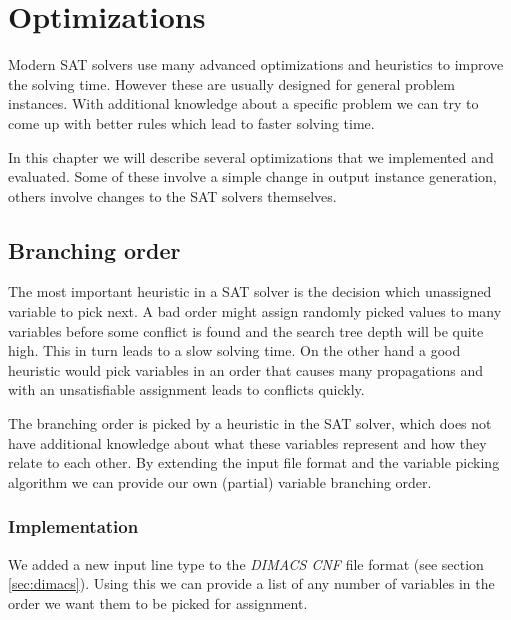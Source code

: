 \section{Optimizations}

Modern SAT solvers use many advanced optimizations and heuristics to improve the solving time.
However these are usually designed for general problem instances.
With additional knowledge about a specific problem we can try to come up with better rules which lead to faster solving time.

In this chapter we will describe several optimizations that we implemented and evaluated.
Some of these involve a simple change in output instance generation, others involve changes to the SAT solvers themselves.


\subsection{Branching order}
\label{sec:branching-order}

The most important heuristic in a SAT solver is the decision which unassigned variable to pick next.
A bad order might assign randomly picked values to many variables before some conflict is found and the search tree depth will be quite high.
This in turn leads to a slow solving time.
On the other hand a good heuristic would pick variables in an order that causes many propagations and with an unsatisfiable assignment leads to conflicts quickly.

The branching order is picked by a heuristic in the SAT solver, which does not have additional knowledge about what these variables represent and how they relate to each other.
By extending the input file format and the variable picking algorithm we can provide our own (partial) variable branching order.

\subsubsection{Implementation}

We added a new input line type to the \emph{DIMACS CNF} file format (see section \ref{sec:dimacs}).
Using this we can provide a list of any number of variables in the order we want them to be picked for assignment.

